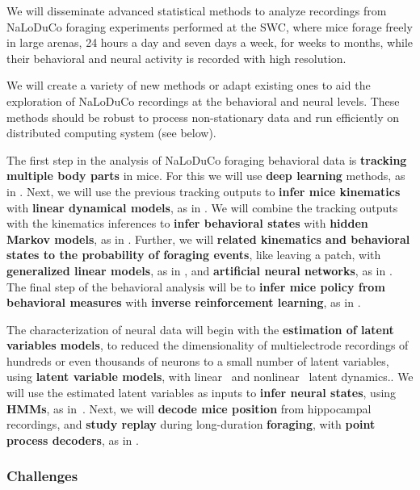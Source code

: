 \documentclass[12pt]{article}
\begin{document}
We will disseminate advanced statistical methods to analyze recordings from NaLoDuCo
foraging experiments performed at the SWC, where mice forage freely in large
arenas, 24 hours a day and seven days a week, for weeks to months, while their
behavioral and neural activity is recorded with high resolution.

We will create a variety of new methods or adapt existing ones to aid the
exploration of NaLoDuCo recordings at the behavioral and neural levels. These
methods should be robust to process non-stationary data and run efficiently on
distributed computing system (see below).

The first step in the analysis of NaLoDuCo foraging behavioral data is
\textbf{tracking multiple body parts} in mice. For this we will use
\textbf{deep learning} methods, as in
\citep{https://pubmed.ncbi.nlm.nih.gov/30127430/}.
%
Next, we will use the previous tracking outputs to \textbf{infer mice
kinematics} with \textbf{linear dynamical models}, as in
\citep{https://github.com/joacorapela/lds}.
%
We will combine the tracking outputs with the kinematics inferences to
\textbf{infer behavioral states} with \textbf{hidden Markov models}, as in
\citep{https://pubmed.ncbi.nlm.nih.gov/26687221/}.
%
Further, we will \textbf{related kinematics and behavioral states to the
probability of foraging events}, like leaving a patch, with \textbf{generalized
linear models}, as in \citep{}, and \textbf{artificial neural networks}, as in \citep{}.
%
The final step of the behavioral analysis will be to \textbf{infer mice policy
from behavioral measures} with \textbf{inverse reinforcement learning}, as in
\cite{https://arxiv.org/abs/2311.13870v2}.

The characterization of neural data will begin with the \textbf{estimation of latent
variables models}, to reduced the dimensionality of multielectrode recordings of
hundreds or even thousands of neurons to a small number of latent variables,
using \textbf{latent variable models}, with linear~\citep{dunckerAndSahanai18}
and nonlinear~\citep{pandarinathEtAl} latent dynamics..
%
We will use the estimated latent variables as inputs to
\textbf{infer neural states}, using \textbf{HMMs}, as in~\citep{}.
%
Next, we will \textbf{decode mice position} from hippocampal recordings, and
\textbf{study
replay} during long-duration \textbf{foraging}, with \textbf{point process
decoders}, as in \citep{ppDecoder}.

\subsubsection{Challenges}
\end{document}
